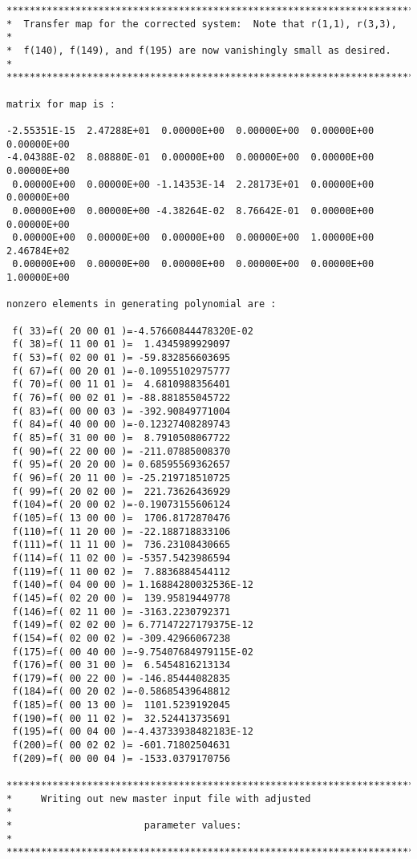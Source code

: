 \begin{footnotesize}
\begin{verbatim}
***************************************************************************
*  Transfer map for the corrected system:  Note that r(1,1), r(3,3),      *
*  f(140), f(149), and f(195) are now vanishingly small as desired.       *
***************************************************************************

matrix for map is :

-2.55351E-15  2.47288E+01  0.00000E+00  0.00000E+00  0.00000E+00  0.00000E+00
-4.04388E-02  8.08880E-01  0.00000E+00  0.00000E+00  0.00000E+00  0.00000E+00
 0.00000E+00  0.00000E+00 -1.14353E-14  2.28173E+01  0.00000E+00  0.00000E+00
 0.00000E+00  0.00000E+00 -4.38264E-02  8.76642E-01  0.00000E+00  0.00000E+00
 0.00000E+00  0.00000E+00  0.00000E+00  0.00000E+00  1.00000E+00  2.46784E+02
 0.00000E+00  0.00000E+00  0.00000E+00  0.00000E+00  0.00000E+00  1.00000E+00

nonzero elements in generating polynomial are :

 f( 33)=f( 20 00 01 )=-4.57660844478320E-02
 f( 38)=f( 11 00 01 )=  1.4345989929097
 f( 53)=f( 02 00 01 )= -59.832856603695
 f( 67)=f( 00 20 01 )=-0.10955102975777
 f( 70)=f( 00 11 01 )=  4.6810988356401
 f( 76)=f( 00 02 01 )= -88.881855045722
 f( 83)=f( 00 00 03 )= -392.90849771004
 f( 84)=f( 40 00 00 )=-0.12327408289743
 f( 85)=f( 31 00 00 )=  8.7910508067722
 f( 90)=f( 22 00 00 )= -211.07885008370
 f( 95)=f( 20 20 00 )= 0.68595569362657
 f( 96)=f( 20 11 00 )= -25.219718510725
 f( 99)=f( 20 02 00 )=  221.73626436929
 f(104)=f( 20 00 02 )=-0.19073155606124
 f(105)=f( 13 00 00 )=  1706.8172870476
 f(110)=f( 11 20 00 )= -22.188718833106
 f(111)=f( 11 11 00 )=  736.23108430665
 f(114)=f( 11 02 00 )= -5357.5423986594
 f(119)=f( 11 00 02 )=  7.8836884544112
 f(140)=f( 04 00 00 )= 1.16884280032536E-12
 f(145)=f( 02 20 00 )=  139.95819449778
 f(146)=f( 02 11 00 )= -3163.2230792371
 f(149)=f( 02 02 00 )= 6.77147227179375E-12
 f(154)=f( 02 00 02 )= -309.42966067238
 f(175)=f( 00 40 00 )=-9.75407684979115E-02
 f(176)=f( 00 31 00 )=  6.5454816213134
 f(179)=f( 00 22 00 )= -146.85444082835
 f(184)=f( 00 20 02 )=-0.58685439648812
 f(185)=f( 00 13 00 )=  1101.5239192045
 f(190)=f( 00 11 02 )=  32.524413735691
 f(195)=f( 00 04 00 )=-4.43733938482183E-12
 f(200)=f( 00 02 02 )= -601.71802504631
 f(209)=f( 00 00 04 )= -1533.0379170756

************************************************************************
*     Writing out new master input file with adjusted                  *
*                       parameter values:                              *
************************************************************************


\end{verbatim}
\end{footnotesize}

